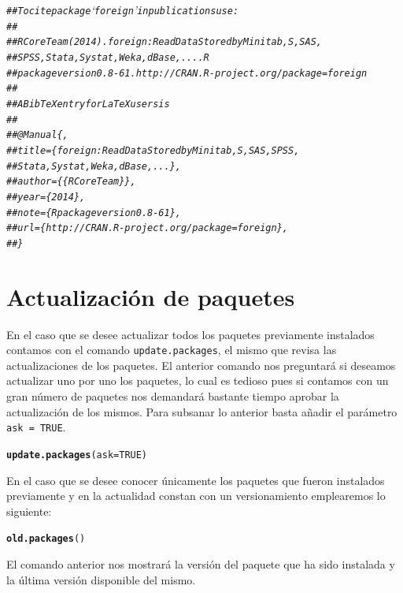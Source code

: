 \documentclass[11pt,a4paper,oneside]{book}\usepackage[]{graphicx}\usepackage[]{color}
\makeatletter
\newcommand{\hlnum}[1]{\textcolor[rgb]{0.686,0.059,0.569}{#1}}%
\newcommand{\hlcom}[1]{\textcolor[rgb]{0.678,0.584,0.686}{\textit{#1}}}%
\newcommand{\hlstd}[1]{\textcolor[rgb]{0.345,0.345,0.345}{#1}}%
\newcommand{\hlkwc}[1]{\textcolor[rgb]{0.333,0.667,0.333}{#1}}%
\newcommand{\hlkwd}[1]{\textcolor[rgb]{0.737,0.353,0.396}{\textbf{#1}}}%
\newenvironment{kframe}{%
 \def\at@end@of@kframe{}%
 \ifinner\ifhmode%
  \def\at@end@of@kframe{\end{minipage}}%
  \begin{minipage}{\columnwidth}%
 \fi\fi%
 \def\FrameCommand##1{\hskip\@totalleftmargin \hskip-\fboxsep
 \colorbox{shadecolor}{##1}\hskip-\fboxsep
     \hskip-\linewidth \hskip-\@totalleftmargin \hskip\columnwidth}%
 \MakeFramed {\advance\hsize-\width
   \@totalleftmargin\z@ \linewidth\hsize
   \@setminipage}}%
 {\par\unskip\endMakeFramed%
 \at@end@of@kframe}
\newenvironment{knitrout}{}{} %
\makeatother
\begin{document}
\begin{itemize}
\begin{knitrout}
\begin{kframe}
\begin{alltt}
\hlcom{## To cite package ‘foreign’ in publications use:}
\hlcom{##}
\hlcom{##  R Core Team (2014). foreign: Read Data Stored by Minitab, S, SAS, }
\hlcom{##  SPSS, Stata, Systat, Weka, dBase, .... R}
\hlcom{##  package version 0.8-61. http://CRAN.R-project.org/package=foreign}
\hlcom{##}
\hlcom{## A BibTeX entry for LaTeX users is}
\hlcom{##}
\hlcom{##  @Manual\{,}
\hlcom{##    title = \{foreign: Read Data Stored by Minitab, S, SAS, SPSS,}
\hlcom{##  Stata, Systat, Weka,dBase, ...\},}
\hlcom{##    author = \{\{R Core Team\}\},}
\hlcom{##    year = \{2014\},}
\hlcom{##    note = \{R package version 0.8-61\},}
\hlcom{##    url = \{http://CRAN.R-project.org/package=foreign\},}
\hlcom{##  \}}
\end{alltt}
\end{kframe}
\end{knitrout}

\section{Actualización de paquetes}

En el caso que se desee actualizar todos los paquetes previamente instalados contamos con el comando \texttt{update.packages}, el mismo que revisa las actualizaciones de los paquetes. El anterior comando nos preguntará si deseamos actualizar uno por uno los paquetes, lo cual es tedioso pues si contamos con un gran número de paquetes nos demandará bastante tiempo aprobar la actualización de los mismos. Para subsanar lo anterior basta añadir el parámetro \texttt{ask = TRUE}.
\begin{knitrout}
\color{fgcolor}\begin{kframe}
\begin{alltt}
\hlkwd{update.packages}\hlstd{(}\hlkwc{ask}\hlstd{=}\hlnum{TRUE}\hlstd{)}
\end{alltt}
\end{kframe}
\end{knitrout}
En el caso que se desee conocer únicamente los paquetes que fueron instalados previamente y en la actualidad constan con un versionamiento emplearemos lo siguiente:
\begin{knitrout}
\color{fgcolor}\begin{kframe}
\begin{alltt}
\hlkwd{old.packages}\hlstd{()}
\end{alltt}
\end{kframe}
\end{knitrout}
El comando anterior nos mostrará la versión del paquete que ha sido instalada y la última versión disponible del mismo.\newline


\end{itemize}
\end{document}

